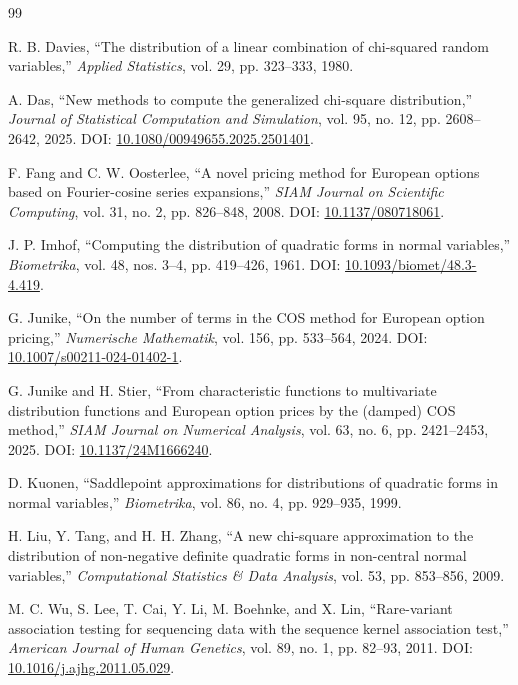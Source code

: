 \documentclass[11pt]{article}
\theoremstyle{definition}
\begin{document}
\begin{thebibliography}{99}

R. B. Davies,
``The distribution of a linear combination of chi-squared random variables,''
\emph{Applied Statistics}, vol. 29, pp. 323--333, 1980.

A. Das,
``New methods to compute the generalized chi-square distribution,''
\emph{Journal of Statistical Computation and Simulation}, vol. 95, no. 12, pp. 2608--2642, 2025.
DOI: \href{https://doi.org/10.1080/00949655.2025.2501401}{10.1080/00949655.2025.2501401}.

F. Fang and C. W. Oosterlee,
``A novel pricing method for European options based on Fourier-cosine series expansions,''
\emph{SIAM Journal on Scientific Computing}, vol. 31, no. 2, pp. 826--848, 2008.
DOI: \href{https://doi.org/10.1137/080718061}{10.1137/080718061}.

J. P. Imhof,
``Computing the distribution of quadratic forms in normal variables,''
\emph{Biometrika}, vol. 48, nos. 3--4, pp. 419--426, 1961.
DOI: \href{https://doi.org/10.1093/biomet/48.3-4.419}{10.1093/biomet/48.3-4.419}.

G. Junike,
``On the number of terms in the COS method for European option pricing,''
\emph{Numerische Mathematik}, vol. 156, pp. 533--564, 2024.
DOI: \href{https://doi.org/10.1007/s00211-024-01402-1}{10.1007/s00211-024-01402-1}.

G. Junike and H. Stier,
``From characteristic functions to multivariate distribution functions and European option prices by the (damped) COS method,''
\emph{SIAM Journal on Numerical Analysis}, vol. 63, no. 6, pp. 2421--2453, 2025.
DOI: \href{https://doi.org/10.1137/24M1666240}{10.1137/24M1666240}.

D. Kuonen,
``Saddlepoint approximations for distributions of quadratic forms in normal variables,''
\emph{Biometrika}, vol. 86, no. 4, pp. 929--935, 1999.

H. Liu, Y. Tang, and H. H. Zhang,
``A new chi-square approximation to the distribution of non-negative definite quadratic forms in non-central normal variables,''
\emph{Computational Statistics \& Data Analysis}, vol. 53, pp. 853--856, 2009.

M. C. Wu, S. Lee, T. Cai, Y. Li, M. Boehnke, and X. Lin,
``Rare-variant association testing for sequencing data with the sequence kernel association test,''
\emph{American Journal of Human Genetics}, vol. 89, no. 1, pp. 82--93, 2011.
DOI: \href{https://doi.org/10.1016/j.ajhg.2011.05.029}{10.1016/j.ajhg.2011.05.029}.

\end{thebibliography}
\end{document}
